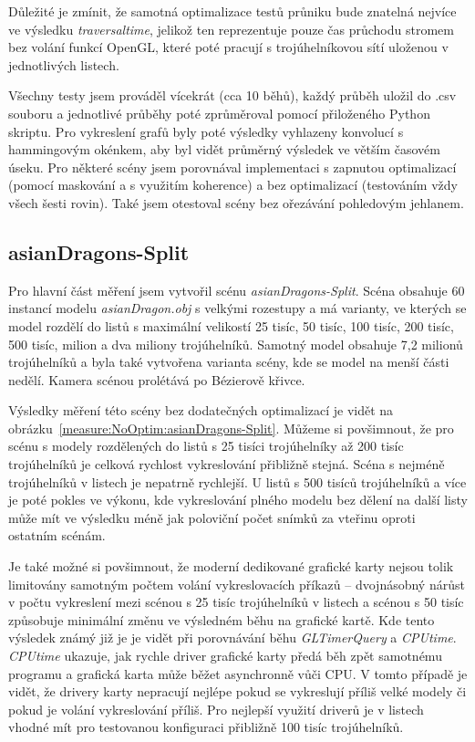 \documentclass[report,11pt]{elsarticle}
\begin{document}
Důležité je zmínit, že samotná optimalizace testů průniku bude znatelná nejvíce
ve výsledku \textit{traversaltime}, jelikož ten reprezentuje pouze čas průchodu
stromem bez volání funkcí OpenGL, které poté pracují s trojúhelníkovou sítí
uloženou v jednotlivých listech.

Všechny testy jsem prováděl vícekrát (cca 10 běhů), každý průběh uložil do .csv
souboru a jednotlivé průběhy poté zprůměroval pomocí přiloženého Python skriptu.
Pro vykreslení grafů byly poté výsledky vyhlazeny konvolucí s hammingovým okénkem,
aby byl vidět průměrný výsledek ve větším časovém úseku. Pro některé scény jsem porovnával
implementaci s zapnutou optimalizací (pomocí maskování a s využitím koherence)
a bez optimalizací (testováním vždy všech šesti rovin). Také jsem otestoval scény
bez ořezávání pohledovým jehlanem.

\subsection{asianDragons-Split}

Pro hlavní část měření jsem vytvořil scénu \textit{asianDragons-Split}. Scéna obsahuje
60 instancí modelu \textit{asianDragon.obj} s velkými rozestupy a má varianty,
ve kterých  se model rozdělí do listů s maximální velikostí 25 tisíc, 50 tisíc,
100 tisíc, 200 tisíc, 500 tisíc, milion a dva miliony trojúhelníků. Samotný
model obsahuje 7,2 milionů trojúhelníků a byla také vytvořena varianta scény,
kde se model na menší části nedělí. Kamera scénou prolétává po Bézierově
křivce.

Výsledky měření této scény bez dodatečných optimalizací je vidět na
obrázku~\ref{measure:NoOptim:asianDragons-Split}. Můžeme si povšimnout, že pro
scénu s modely rozdělených do listů s 25 tisíci trojúhelníky až 200 tisíc
trojúhelníků je celková rychlost vykreslování přibližně stejná. Scéna s nejméně
trojúhelníků v listech je nepatrně rychlejší. U listů s 500 tisíců trojúhelníků
a více je poté pokles ve výkonu, kde vykreslování plného modelu bez dělení na
další listy může mít ve výsledku méně jak poloviční počet snímků za vteřinu
oproti ostatním scénám.

Je také možné si povšimnout, že moderní dedikované grafické karty
nejsou tolik limitovány samotným počtem volání vykreslovacích příkazů --
dvojnásobný nárůst v počtu vykreslení mezi scénou s 25 tisíc trojúhelníků v
listech a scénou s 50 tisíc způsobuje minimální změnu ve výsledném běhu na
grafické kartě. Kde tento výsledek známý již je je vidět při porovnávání běhu
\textit{GLTimerQuery} a \textit{CPUtime}. \textit{CPUtime} ukazuje, jak rychle
driver grafické karty předá běh zpět samotnému programu a grafická karta může
běžet asynchronně vůči CPU. V tomto případě je vidět, že drivery karty nepracují
nejlépe pokud se vykreslují příliš velké modely či pokud je volání vykreslování
příliš. Pro nejlepší využití driverů je v listech vhodné mít pro testovanou
konfiguraci přibližně 100 tisíc trojúhelníků.
\end{document}

